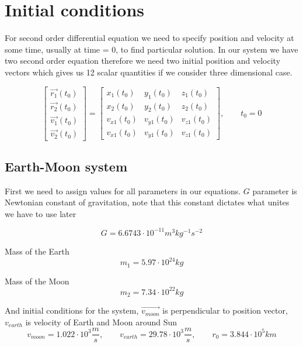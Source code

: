 \documentclass[english,12pt,a4paper]{report}
\begin{document}
	\section{Initial conditions}
	
	For second order differential equation we need to specify position and velocity at some time, usually at time = 0, to find particular solution. In our system we have two second order equation therefore we need two initial position and velocity vectors which gives us 12 scalar quantities if we consider three dimensional case.
	
	\begin{equation}
		\begin{bmatrix}
			\vec{r_1}(t_0) \\ \vec{r_2}(t_0) \\ \vec{v_1}(t_0) \\ \vec{v_2}(t_0)
		\end{bmatrix}
		=
		\begin{bmatrix}
			x_1(t_0) & y_1(t_0) & z_1(t_0)\\
			x_2(t_0) & y_2(t_0) & z_2(t_0)\\
			v_{x1}(t_0) & v_{y1}(t_0) & v_{z1}(t_0)\\
			v_{x1}(t_0) & v_{y1}(t_0) & v_{z1}(t_0)
		\end{bmatrix}
		, \qquad t_0 = 0
	\end{equation}
	
	\subsection{Earth-Moon system}
	
	First we need to assign values for all parameters in our equations.
	$G$ parameter is Newtonian constant of gravitation, note that this constant dictates what unites we have to use later
	
	\begin{equation}\label{eq:G}
		G = 6.6743 \cdot 10^{-11} m^3 kg^{-1} s^{-2}
	\end{equation}
	
	Mass of the Earth
	$$ m_1 = 5.97 \cdot 10^{24} kg $$
	
	Mass of the Moon
	$$ m_2 = 7.34 \cdot 10^{22} kg $$
	
	And initial conditions for the system, $\vec{v_{moon}}$ is perpendicular to position vector, $v_{earth}$ is velocity of Earth and Moon around Sun
	$$
	v_{moon} = 1.022 \cdot 10^3 \frac{m}{s}
	, \qquad v_{earth} = 29.78 \cdot 10^3 \frac{m}{s}
	, \qquad r_0 = 3.844 \cdot 10^5 km
	$$
	
\end{document}
